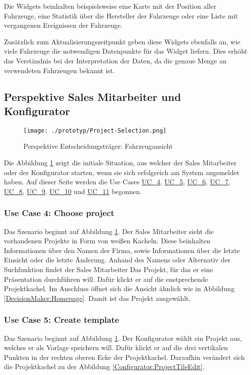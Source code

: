 Die Widgets beinhalten beispielsweise eine Karte mit der Position aller Fahrzeuge, eine Statistik über die Hersteller der Fahrzeuge oder eine Liste mit vergangenen Ereignissen der Fahrzeuge. 

Zusätzlich zum Aktualisierungszeitpunkt geben diese Widgets ebenfalls an, wie viele Fahrzeuge die notwendigen Datenpunkte für das Widget liefern. Dies erhöht das Verständnis bei der Interpretation der Daten, da die genaue Menge an verwendeten Fahrzeugen bekannt ist.

\newpage
\subsection{Perspektive Sales Mitarbeiter und Konfigurator}

\begin{figure}[ht]
  \centering
  \texttt{[image: ./prototyp/Project-Selection.png]}
  \caption{Perspektive Entscheidungsträger: Fahrzeugansicht}
  \label{Configurator:ProjectSelection}
\end{figure}
Die Abbildung \ref{Configurator:ProjectSelection} zeigt die initiale Situation, aus welcher der Sales Mitarbeiter oder der Konfigurator starten, wenn sie sich erfolgreich am System angemeldet haben. Auf dieser Seite werden die Use Cases \hyperlink{Ref:UC4}{UC\_4},  \hyperlink{Ref:UC5}{UC\_5},  \hyperlink{Ref:UC6}{UC\_6},  \hyperlink{Ref:UC7}{UC\_7}, \hyperlink{Ref:UC8}{UC\_8},  \hyperlink{Ref:UC9}{UC\_9},  \hyperlink{Ref:UC10}{UC\_10} und  \hyperlink{Ref:UC11}{UC\_11} begonnen.

\subsubsection{Use Case 4: Choose project}
Das Szenario beginnt auf Abbildung \ref{Configurator:ProjectSelection}. Der Sales Mitarbeiter sieht die vorhandenen Projekte in Form von weißen Kacheln. Diese beinhalten Informationen über den Namen der Firma, sowie Informationen über die letzte Einsicht oder die letzte Änderung. Anhand des Namens oder Alternativ der Suchfunktion findet der Sales Mitarbeiter Das Projekt, für das er eine Präsentation durchführen will. Dafür klickt er auf die enstprechende Projektkachel. Im Anschluss öffnet sich die Ansicht ähnlich wie in Abbildung \ref{DecisionMaker:Homepage}. Damit ist das Projekt ausgewählt.

\subsubsection{Use Case 5: Create template}
Das Szenario beginnt auf Abbildung \ref{Configurator:ProjectSelection}. Der Konfigurator wählt ein Projekt aus, welches er als Vorlage speichern will. Dafür klickt er auf die drei vertikalen Punkten in der rechten oberen Ecke der Projektkachel. Daraufhin verändert sich die Projektkachel zu der Abbildung \ref{Configurator:ProjectTileEdit}.

